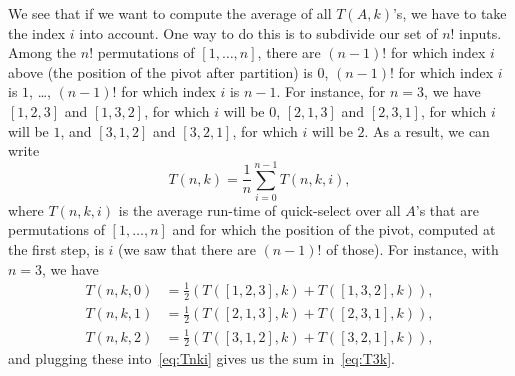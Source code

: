 \documentclass{report}
\begin{document}
We see that if we want to compute the average of all $T(A,k)$'s, we
have to take the index $i$ into account.  One way to do this is to
subdivide our set of $n!$ inputs. Among the $n!$ permutations of
$[1,\dots,n]$, there are $(n-1)!$ for which index $i$ above (the
position of the pivot after partition) is $0$, $(n-1)!$ for which index $i$ is $1$,
\dots, $(n-1)!$ for which index $i$ is $n-1$. For instance, for $n=3$,
we have $[1,2,3]$ and $[1,3,2]$, for which $i$ will be $0$, $[2,1,3]$
and $[2,3,1]$, for which $i$ will be $1$, and $[3,1,2]$ and $[3,2,1]$,
for which $i$ will be $2$. As a result, we can write
\begin{equation}\label{eq:Tnki}
T(n,k) = \frac 1n \sum_{i=0}^{n-1} T(n,k,i),  
\end{equation}
where $T(n,k,i)$ is the average run-time of quick-select over all
$A$'s that are permutations of $[1,\dots,n]$ and for which the
position of the pivot, computed at the first step, is $i$ (we saw that
there are $(n-1)!$ of those).  For instance, with $n=3$, we have
\begin{align*}
T(n,k,0)&=\frac 12 (T([1,2,3],k) + T([1,3,2],k)),\\
T(n,k,1)&=\frac 12 (T([2,1,3],k) + T([2,3,1],k)),\\
T(n,k,2)&=\frac 12 (T([3,1,2],k) + T([3,2,1],k)),
\end{align*}
and plugging these into~\eqref{eq:Tnki} gives us the sum in~\eqref{eq:T3k}.
\end{document}
